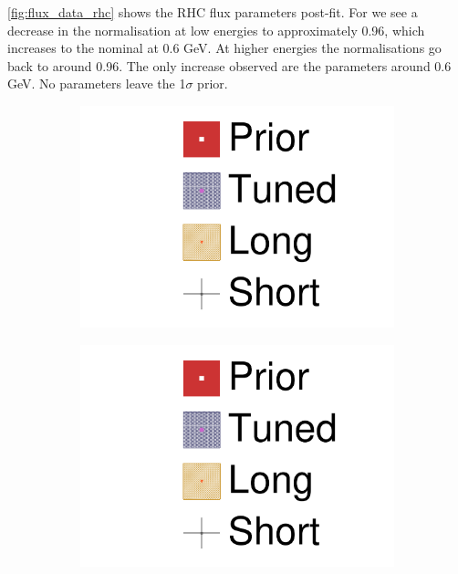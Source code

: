 \autoref{fig:flux_data_rhc} shows the RHC flux parameters post-fit. For \numubar we see a decrease in the normalisation at low energies to approximately 0.96, which increases to the nominal at 0.6 GeV. At higher energies the normalisations go back to around 0.96. The only increase observed are the \nuebar parameters around 0.6 GeV. No parameters leave the 1$\sigma$ prior.
\begin{figure}[h]
	\begin{subfigure}[t]{0.24\textwidth}
		\includegraphics[width=\textwidth, trim={0mm 0mm 0mm 0mm}, clip,page=6]{figures/mach3/data/2017b_NewData_NewDet_UpdXsecStep_2Xsec_4Det_5Flux_0_2017b_June_NewDet_merge_2017b_NewDet_June_Long_0}
	\end{subfigure}
	\begin{subfigure}[t]{0.24\textwidth}
		\includegraphics[width=\textwidth, trim={0mm 0mm 0mm 0mm}, clip,page=7]{figures/mach3/data/2017b_NewData_NewDet_UpdXsecStep_2Xsec_4Det_5Flux_0_2017b_June_NewDet_merge_2017b_NewDet_June_Long_0}

\end{subfigure}
\end{figure}
